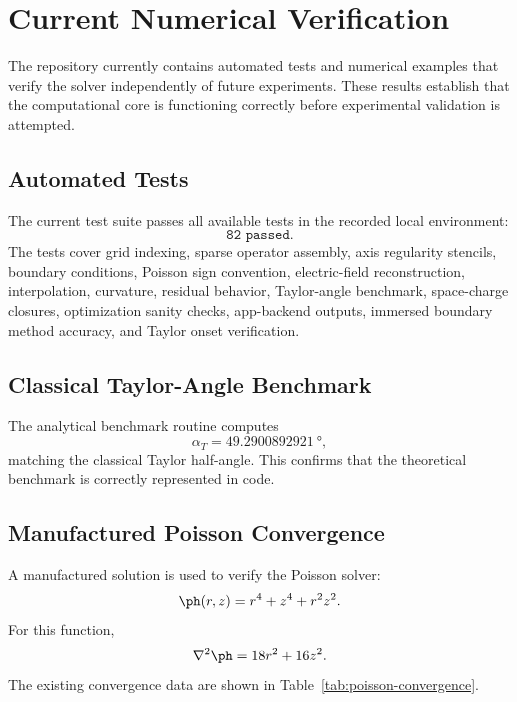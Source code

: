 \section{Current Numerical Verification}

The repository currently contains automated tests and numerical examples that verify the solver independently of future experiments. These results establish that the computational core is functioning correctly before experimental validation is attempted.

\subsection{Automated Tests}

The current test suite passes all available tests in the recorded local environment:
\begin{equation*}
\texttt{82 passed}.
\end{equation*}
The tests cover grid indexing, sparse operator assembly, axis regularity stencils, boundary conditions, Poisson sign convention, electric-field reconstruction, interpolation, curvature, residual behavior, Taylor-angle benchmark, space-charge closures, optimization sanity checks, app-backend outputs, immersed boundary method accuracy, and Taylor onset verification.

\subsection{Classical Taylor-Angle Benchmark}

The analytical benchmark routine computes
\begin{equation*}
\alpha_T = \SI{49.2900892921}{\degree},
\end{equation*}
matching the classical Taylor half-angle. This confirms that the theoretical benchmark is correctly represented in code.

\subsection{Manufactured Poisson Convergence}

A manufactured solution is used to verify the Poisson solver:
\begin{equation}
\ph(r,z)=r^4+z^4+r^2z^2.
\end{equation}
For this function,
\begin{equation}
\nabla^2\ph=18r^2+16z^2.
\end{equation}
The existing convergence data are shown in Table~\ref{tab:poisson-convergence}.

